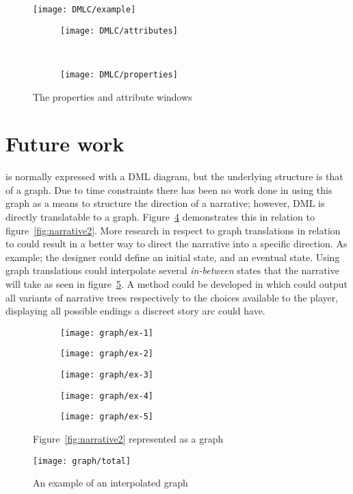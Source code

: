 \begin{figure}
	\texttt{[image: DMLC/example]}
\end{figure}
\begin{figure}
\centering
\begin{subfigure}{0.4\textwidth}
	\texttt{[image: DMLC/attributes]}
\label{fig:DMLC:screens:attributes}
\end{subfigure}
~
\begin{subfigure}{0.4\textwidth}
	\texttt{[image: DMLC/properties]}
\label{fig:DMLC:screens:properties}
\end{subfigure}
	\caption{The properties and attribute windows}\label{fig:DMLC:screens}
\end{figure}


\section{Future work}
\diage is normally expressed with a DML diagram, but the underlying structure is that of a graph.
Due to time constraints there has been no work done in using this graph as a means to structure the direction of a narrative; however, DML is directly translatable to a graph.
Figure~\ref{fig:graph:fetch} demonstrates this in relation to figure~\ref{fig:narrative2}.
More research in respect to graph translations in relation to \diage could result in a better way to direct the narrative into a specific direction.
As example; the designer could define an initial state, and an eventual state.
Using graph translations \diage could interpolate several \textit{in-between} states that the narrative will take as seen in figure~\ref{fig:graph}.
A method could be developed in which \diage could output all variants of narrative trees respectively to the choices available to the player, displaying all possible endings a discreet story arc could have.

\begin{figure}[p]
\centering
	\begin{subfigure}{0.4\textwidth}
		\texttt{[image: graph/ex-1]}
	\end{subfigure}
	\begin{subfigure}{0.4\textwidth}
		\texttt{[image: graph/ex-2]}
	\end{subfigure}
	\begin{subfigure}{0.4\textwidth}
		\texttt{[image: graph/ex-3]}
	\end{subfigure}
	\begin{subfigure}{0.4\textwidth}
		\texttt{[image: graph/ex-4]}
	\end{subfigure}
	\begin{subfigure}{0.4\textwidth}
		\texttt{[image: graph/ex-5]}
	\end{subfigure}
	\caption{Figure~\ref{fig:narrative2} represented as a graph}\label{fig:graph:fetch}
\end{figure}

\begin{figure}
	\texttt{[image: graph/total]}
	\caption{An example of an interpolated graph} \label{fig:graph}
\end{figure}
